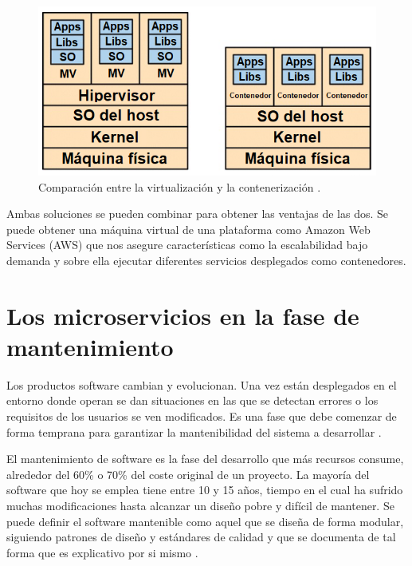 \documentclass[11pt,spanish,listoffigures]{tfgetsinf}
\begin{document}
\begin{figure}[h]
\centering
\includegraphics[scale=0.8]{containers_vms_ES}
\caption{Comparación entre la virtualización y la contenerización \cite{Newman2015a}.}
\label{fig:containers_vms_ES}
\end{figure}

Ambas soluciones se pueden combinar para obtener las ventajas de las dos. Se puede obtener una máquina virtual de una plataforma como Amazon Web Services (AWS) que nos asegure características como la escalabilidad bajo demanda y sobre ella ejecutar diferentes servicios desplegados como contenedores.

\section{Los microservicios en la fase de mantenimiento}

Los productos software cambian y evolucionan. Una vez están desplegados en el entorno donde operan se dan situaciones en las que se detectan errores o los requisitos de los usuarios se ven modificados. Es una fase que debe comenzar de forma temprana para garantizar la mantenibilidad del sistema a desarrollar \cite{Bourque2014}.

El mantenimiento de software es la fase del desarrollo que más recursos consume, alrededor del 60\% o 70\% del coste original de un proyecto. La mayoría del software que hoy se emplea tiene entre 10 y 15 años, tiempo en el cual ha sufrido muchas modificaciones hasta alcanzar un diseño pobre y difícil de mantener. Se puede definir el software mantenible como aquel que se diseña de forma modular, siguiendo patrones de diseño y estándares de calidad y que se documenta de tal forma que es explicativo por si mismo \cite{Pressman}.
\end{document}
